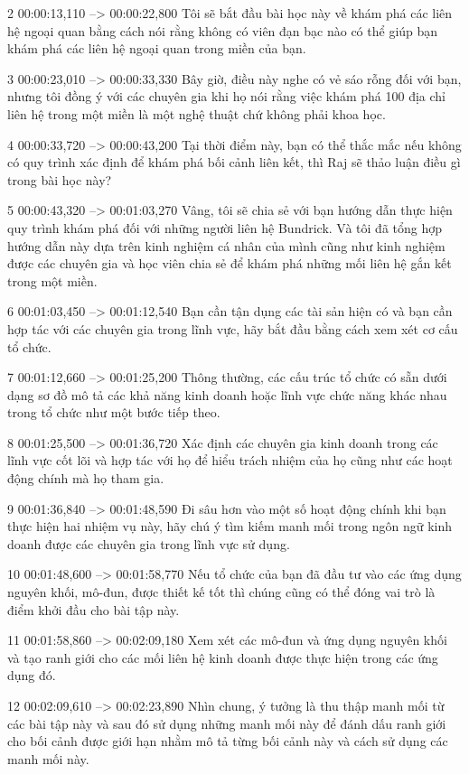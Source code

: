 2
00:00:13,110 --> 00:00:22,800
Tôi sẽ bắt đầu bài học này về khám phá các liên hệ ngoại quan bằng cách nói rằng không có viên đạn bạc nào có thể giúp bạn khám phá các liên hệ ngoại quan trong miền của bạn.

3
00:00:23,010 --> 00:00:33,330
Bây giờ, điều này nghe có vẻ sáo rỗng đối với bạn, nhưng tôi đồng ý với các chuyên gia khi họ nói rằng việc khám phá 100 địa chỉ liên hệ trong một miền là một nghệ thuật chứ không phải khoa học.

4
00:00:33,720 --> 00:00:43,200
Tại thời điểm này, bạn có thể thắc mắc nếu không có quy trình xác định để khám phá bối cảnh liên kết, thì Raj sẽ thảo luận điều gì trong bài học này?

5
00:00:43,320 --> 00:01:03,270
Vâng, tôi sẽ chia sẻ với bạn hướng dẫn thực hiện quy trình khám phá đối với những người liên hệ Bundrick.  Và tôi đã tổng hợp hướng dẫn này dựa trên kinh nghiệm cá nhân của mình cũng như kinh nghiệm được các chuyên gia và học viên chia sẻ để khám phá những mối liên hệ gắn kết trong một miền.

6
00:01:03,450 --> 00:01:12,540
Bạn cần tận dụng các tài sản hiện có và bạn cần hợp tác với các chuyên gia trong lĩnh vực, hãy bắt đầu bằng cách xem xét cơ cấu tổ chức.

7
00:01:12,660 --> 00:01:25,200
Thông thường, các cấu trúc tổ chức có sẵn dưới dạng sơ đồ mô tả các khả năng kinh doanh hoặc lĩnh vực chức năng khác nhau trong tổ chức như một bước tiếp theo.

8
00:01:25,500 --> 00:01:36,720
Xác định các chuyên gia kinh doanh trong các lĩnh vực cốt lõi và hợp tác với họ để hiểu trách nhiệm của họ cũng như các hoạt động chính mà họ tham gia.

9
00:01:36,840 --> 00:01:48,590
Đi sâu hơn vào một số hoạt động chính khi bạn thực hiện hai nhiệm vụ này, hãy chú ý tìm kiếm manh mối trong ngôn ngữ kinh doanh được các chuyên gia trong lĩnh vực sử dụng.

10
00:01:48,600 --> 00:01:58,770
Nếu tổ chức của bạn đã đầu tư vào các ứng dụng nguyên khối, mô-đun, được thiết kế tốt thì chúng cũng có thể đóng vai trò là điểm khởi đầu cho bài tập này.

11
00:01:58,860 --> 00:02:09,180
Xem xét các mô-đun và ứng dụng nguyên khối và tạo ranh giới cho các mối liên hệ kinh doanh được thực hiện trong các ứng dụng đó.

12
00:02:09,610 --> 00:02:23,890
Nhìn chung, ý tưởng là thu thập manh mối từ các bài tập này và sau đó sử dụng những manh mối này để đánh dấu ranh giới cho bối cảnh được giới hạn nhằm mô tả từng bối cảnh này và cách sử dụng các manh mối này.

